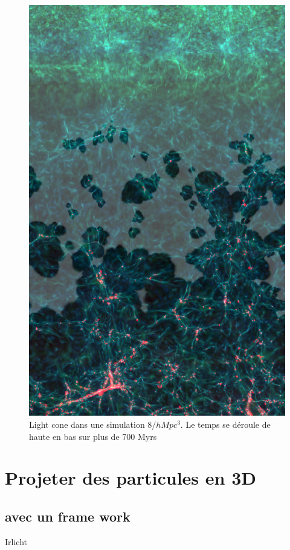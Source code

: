 \begin{figure}[bth]
        \includegraphics[height=.95\textheight]{img/04/frise_wall.png} 
        \caption{Light cone dans une simulation $8/h Mpc ^3$. Le temps se déroule de haute en bas sur plus de 700 Myrs }
 		\label{fig:lightcone}
\end{figure}

\section{Projeter des particules en 3D}

\subsection{avec un frame work} 
Irlicht

